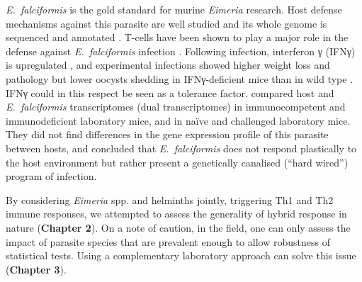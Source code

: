 \textit{E.~falciformis} is the gold standard for murine \textit{Eimeria} research. Host defense mechanisms against this parasite are well studied \parencite[see for example][]{mesfin_pathological_1978, pogonka_cd8_2010, schmid_apicomplexan_2012} and its whole genome is sequenced and annotated \citep{heitlinger_genome_2014}. T-cells have been shown to play a major role in the defense against \textit{E.~falciformis} infection \citep{mesfin_thymic_1979, stiff_effect_1990}. Following infection, interferon γ (IFNγ) is upregulated \citep{schmid_eimeria_2014}, and experimental infections showed higher weight loss and pathology but lower oocysts shedding in IFNγ-deficient mice than in wild type \citep{stange_il-22_2012}. IFNγ could in this respect be seen as a tolerance factor. \cite{ehret_dual_2017} compared host and \textit{E.~falciformis} transcriptomes (dual transcriptomes) in immunocompetent and immunodeficient laboratory mice, and in naïve and challenged laboratory mice. They did not find differences in the gene expression profile of this parasite between hosts, and concluded that \textit{E.~falciformis} does not respond plastically to the host environment but rather present a genetically canalised (“hard wired”) program of infection. 
\par
By considering \textit{Eimeria} spp. and helminths jointly, triggering Th1 and Th2 immune responses, we attempted to assess the generality of hybrid response in nature (\textbf{Chapter 2}). On a note of caution, in the field, one can only assess the impact of parasite species that are prevalent enough to allow robustness of statistical tests. Using a complementary laboratory approach can solve this issue (\textbf{Chapter 3}).
